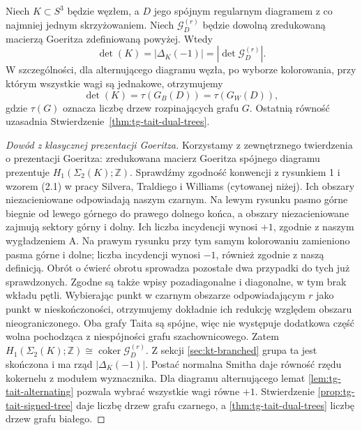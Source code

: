 \begin{twierdzenie}
Niech $K\subset S^3$ będzie węzłem, a $D$ jego
spójnym regularnym diagramem z co najmniej jednym
skrzyżowaniem. Niech $\mathcal G_D^{(r)}$ będzie dowolną zredukowaną
macierzą Goeritza zdefiniowaną powyżej. Wtedy
\[
\det(K)=|\Delta_K(-1)|=|\det\mathcal G_D^{(r)}|.
\]
W szczególności, dla alternującego diagramu węzła,
po wyborze kolorowania, przy którym wszystkie wagi
są jednakowe, otrzymujemy
\[
\det(K)=\tau(G_B(D))=\tau(G_W(D)),
\]
gdzie $\tau(G)$ oznacza liczbę drzew rozpinających
grafu $G$. Ostatnią równość uzasadnia
Stwierdzenie~\ref{thm:tg-tait-dual-trees}.
\end{twierdzenie}
\begin{proof}[Dowód z klasycznej prezentacji Goeritza]
Korzystamy z zewnętrznego twierdzenia o prezentacji
Goeritza: zredukowana macierz Goeritza spójnego
diagramu prezentuje $H_1(\Sigma_2(K);\mathbb Z)$.
Sprawdźmy zgodność konwencji z rysunkiem 1 i wzorem
(2.1) w pracy Silvera, Traldiego i Williams (cytowanej
niżej). Ich obszary niezacieniowane odpowiadają naszym
czarnym. Na lewym rysunku pasmo górne biegnie od lewego
górnego do prawego dolnego końca, a obszary niezacieniowane
zajmują sektory górny i dolny. Ich liczba incydencji
wynosi $+1$, zgodnie z naszym wygładzeniem A. Na prawym
rysunku przy tym samym kolorowaniu zamieniono pasma
górne i dolne; liczba incydencji wynosi $-1$, również
zgodnie z naszą definicją. Obrót o ćwierć obrotu
sprowadza pozostałe dwa przypadki do tych już sprawdzonych.
Zgodne są także wpisy pozadiagonalne i diagonalne,
w tym brak wkładu pętli. Wybierając punkt w czarnym
obszarze odpowiadającym $r$ jako punkt w nieskończoności,
otrzymujemy dokładnie ich redukcję względem obszaru
nieograniczonego. Oba grafy Taita są spójne, więc
nie występuje dodatkowa część wolna pochodząca
z niespójności grafu szachownicowego. Zatem $H_1(\Sigma_2(K);\mathbb Z)\cong
\operatorname{coker}\mathcal G_D^{(r)}$.
Z sekcji \ref{sec:kt-branched} grupa ta jest skończona
i ma rząd $|\Delta_K(-1)|$. Postać normalna Smitha
daje równość rzędu kokernelu z modułem wyznacznika.
Dla diagramu alternującego lemat
\ref{lem:tg-tait-alternating} pozwala wybrać wszystkie
wagi równe $+1$. Stwierdzenie
\ref{prop:tg-tait-signed-tree} daje liczbę drzew
grafu czarnego, a \ref{thm:tg-tait-dual-trees}
liczbę drzew grafu białego.
\end{proof}

